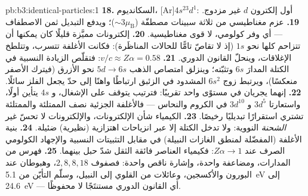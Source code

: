 \begin{solution}{pb:b3:identical-particles:1}
\textbf{18.} السكانديوم، [Ar]$4s^23d^1$: أول إلكترون $d$
غير مزدوج.
\textbf{19.} عزم مغناطيسي من ثلاثة سبينات مصطفّة
($\sim3\mu_{\text{B}}$)؛ ويدفع التبديل ثمن الاصطفاف ---
أي وفر كولومي، لا قوى مغناطيسية.
\textbf{20.} إلكترونات مميَّزة قليلًا كان يمكنها أن تتزاحم كلها
نحو $1s$ (إذ لا تقاصّ تامًّا للحالات المناظَرة): فكانت الأغلفة
تتسرب، وتتلطخ الإغلاقات، وينحلّ القانون الدوري.
\textbf{21.} $v/c \approx Z\alpha = 0.58$: فتقلّص الزيادة النسبية
في الكتلة المدارَ $6s$ وتثبّته؛ وينزلق امتصاص الذهب
$5d \to 6s$ نحو الأزرق (فيترك الأصفر منعكسًا)،
ويرتبط زوج $6s^2$ المشدود في الزئبق ارتباطًا واهنًا إلى حدّ يجعل
الفلز سائلًا.
\textbf{22.} إنهما يجريان في مستوًى واحد تقريبًا: فترتيب يتوقف على
الإشغال، و $4s$ يتأين أولًا، واستعارتا $3d^5$ و $3d^{10}$
في الكروم والنحاس --- فالأغلفة الجزئية نصف الممتلئة والممتلئة تشتري
استقرارًا تبديليًا رخيصًا.
\textbf{23.} الكيمياء شأن الإلكترونات، والإلكترونات
لا تحسّ غير \emph{الشحنة} النووية: ولا تدخل الكتلة إلا
عبر انزياحات اهتزازية (نظيرية) ضئيلة.
\textbf{24.} بنية الأغلفة (المفضّلة لمنطق الغازات النبيلة) في مقابل
التثبيتات النسبية والإجهاد الكولومي الصرف عند
$Z\alpha \to 1$: فكيمياء العناصر فائقة الثقل شدّ حبل بينهما.
\textbf{25.} فهرس من المدارات، ومضاعفة واحدة، وإشارة ناقص
واحدة: فصفوف $2, 8, 8, 18$، وهبوطان عند البورون والأكسجين، وعائلات من
القلوي إلى النبيل، وسلّم التأيّن من \qty{5.1}{eV} إلى
\qty{24.6}{eV} --- أي القانون الدوري مستنتَجًا لا محفوظًا.
\end{solution}
